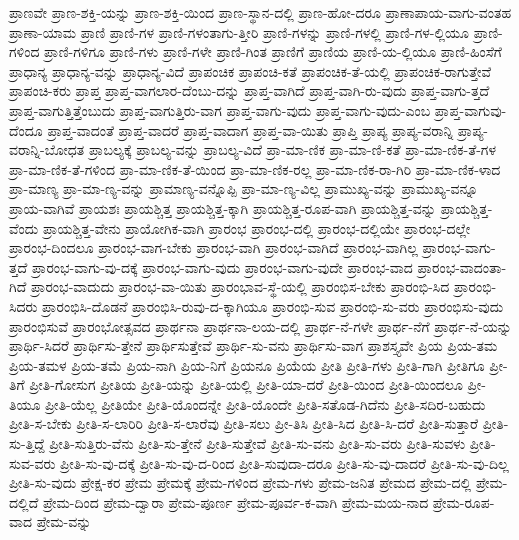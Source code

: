 {ಪ್ರಾಣವೇ
ಪ್ರಾಣ-ಶಕ್ತಿ-ಯನ್ನು
ಪ್ರಾಣ-ಶಕ್ತಿ-ಯಿಂದ
ಪ್ರಾಣ-ಸ್ಥಾನ-ದಲ್ಲಿ
ಪ್ರಾಣ-ಹೋ-ದರೂ
ಪ್ರಾಣಾಪಾಯ-ವಾಗು-ವಂತಹ
ಪ್ರಾಣಾ-ಯಾಮ
ಪ್ರಾಣಿ
ಪ್ರಾಣಿ-ಗಳ
ಪ್ರಾಣಿ-ಗಳಂತಾಗು-ತ್ತೀರಿ
ಪ್ರಾಣಿ-ಗಳನ್ನು
ಪ್ರಾಣಿ-ಗಳಲ್ಲಿ
ಪ್ರಾಣಿ-ಗಳ-ಲ್ಲಿಯೂ
ಪ್ರಾಣಿ-ಗಳಿಂದ
ಪ್ರಾಣಿ-ಗಳಿಗೂ
ಪ್ರಾಣಿ-ಗಳು
ಪ್ರಾಣಿ-ಗಳೇ
ಪ್ರಾಣಿ-ಗಿಂತ
ಪ್ರಾಣಿಗೆ
ಪ್ರಾಣಿಯ
ಪ್ರಾಣಿ-ಯ-ಲ್ಲಿಯೂ
ಪ್ರಾಣಿ-ಹಿಂಸೆಗೆ
ಪ್ರಾಧಾನ್ಯ
ಪ್ರಾಧಾನ್ಯ-ವನ್ನು
ಪ್ರಾಧಾನ್ಯ-ವಿದೆ
ಪ್ರಾಪಂಚಿಕ
ಪ್ರಾಪಂಚಿ-ಕತೆ
ಪ್ರಾಪಂಚಿಕ-ತೆ-ಯಲ್ಲಿ
ಪ್ರಾಪಂಚಿಕ-ರಾಗುತ್ತೇವೆ
ಪ್ರಾಪಂಚಿ-ಕರು
ಪ್ರಾಪ್ತ
ಪ್ರಾಪ್ತ-ವಾಗಲಾರ-ದೆಂಬು-ದನ್ನು
ಪ್ರಾಪ್ತ-ವಾಗಿದೆ
ಪ್ರಾಪ್ತ-ವಾಗಿ-ರು-ವುದು
ಪ್ರಾಪ್ತ-ವಾಗು-ತ್ತದೆ
ಪ್ರಾಪ್ತ-ವಾಗುತ್ತಿತ್ತೆಂಬುದು
ಪ್ರಾಪ್ತ-ವಾಗುತ್ತಿರು-ವಾಗ
ಪ್ರಾಪ್ತ-ವಾಗು-ವುದು
ಪ್ರಾಪ್ತ-ವಾಗು-ವುದು-ಎಂಬ
ಪ್ರಾಪ್ತ-ವಾಗುವು-ದೆಂದೂ
ಪ್ರಾಪ್ತ-ವಾದಂತೆ
ಪ್ರಾಪ್ತ-ವಾದರೆ
ಪ್ರಾಪ್ತ-ವಾದಾಗ
ಪ್ರಾಪ್ತ-ವಾ-ಯಿತು
ಪ್ರಾಪ್ತಿ
ಪ್ರಾಪ್ಯ
ಪ್ರಾಪ್ಯ-ವರಾನ್ನಿ
ಪ್ರಾಪ್ಯ-ವರಾನ್ನಿ-ಬೋಧತ
ಪ್ರಾಬಲ್ಯಕ್ಕೆ
ಪ್ರಾಬಲ್ಯ-ವನ್ನು
ಪ್ರಾಬಲ್ಯ-ವಿದೆ
ಪ್ರಾ-ಮಾ-ಣಿಕ
ಪ್ರಾ-ಮಾ-ಣಿ-ಕತೆ
ಪ್ರಾ-ಮಾ-ಣಿಕ-ತೆ-ಗಳ
ಪ್ರಾ-ಮಾ-ಣಿಕ-ತೆ-ಗಳಿಂದ
ಪ್ರಾ-ಮಾ-ಣಿಕ-ತೆ-ಯಿಂದ
ಪ್ರಾ-ಮಾ-ಣಿಕ-ರಲ್ಲ
ಪ್ರಾ-ಮಾ-ಣಿಕ-ರಾ-ಗಿರಿ
ಪ್ರಾ-ಮಾ-ಣಿಕ-ಳಾದ
ಪ್ರಾ-ಮಾಣ್ಯ
ಪ್ರಾ-ಮಾ-ಣ್ಯ-ವನ್ನು
ಪ್ರಾಮಾಣ್ಯ-ವನ್ನೊಪ್ಪಿ
ಪ್ರಾ-ಮಾ-ಣ್ಯ-ವಿಲ್ಲ
ಪ್ರಾಮುಖ್ಯ-ವನ್ನು
ಪ್ರಾಮುಖ್ಯ-ವನ್ನೂ
ಪ್ರಾಯ-ವಾಗಿವೆ
ಪ್ರಾಯಶಃ
ಪ್ರಾಯಶ್ಚಿತ್ತ
ಪ್ರಾಯಶ್ಚಿತ್ತ-ಕ್ಕಾಗಿ
ಪ್ರಾಯಶ್ಚಿತ್ತ-ರೂಪ-ವಾಗಿ
ಪ್ರಾಯಶ್ಚಿತ್ತ-ವನ್ನು
ಪ್ರಾಯಶ್ಚಿತ್ತ-ವೆಂದು
ಪ್ರಾಯಶ್ಚಿತ್ತ-ವೇನು
ಪ್ರಾಯೋಗಿಕ-ವಾಗಿ
ಪ್ರಾರಂಭ
ಪ್ರಾರಂಭ-ದಲ್ಲಿ
ಪ್ರಾರಂಭ-ದಲ್ಲಿಯೇ
ಪ್ರಾರಂಭ-ದಲ್ಲೇ
ಪ್ರಾರಂಭ-ದಿಂದಲೂ
ಪ್ರಾರಂಭ-ವಾಗ-ಬೇಕು
ಪ್ರಾರಂಭ-ವಾಗಿ
ಪ್ರಾರಂಭ-ವಾಗಿದೆ
ಪ್ರಾರಂಭ-ವಾಗಿಲ್ಲ
ಪ್ರಾರಂಭ-ವಾಗು-ತ್ತದೆ
ಪ್ರಾರಂಭ-ವಾಗು-ವು-ದಕ್ಕೆ
ಪ್ರಾರಂಭ-ವಾಗು-ವುದು
ಪ್ರಾರಂಭ-ವಾಗು-ವುದೇ
ಪ್ರಾರಂಭ-ವಾದ
ಪ್ರಾರಂಭ-ವಾದಂತಾ-ಗಿದೆ
ಪ್ರಾರಂಭ-ವಾದುದು
ಪ್ರಾರಂಭ-ವಾ-ಯಿತು
ಪ್ರಾರಂಭಾವ-ಸ್ಥೆ-ಯಲ್ಲಿ
ಪ್ರಾರಂಭಿಸ-ಬೇಕು
ಪ್ರಾರಂಭಿ-ಸಿದ
ಪ್ರಾರಂಭಿ-ಸಿದರು
ಪ್ರಾರಂಭಿಸಿ-ದೊಡನೆ
ಪ್ರಾರಂಭಿಸಿ-ರುವು-ದ-ಕ್ಕಾಗಿಯೂ
ಪ್ರಾರಂಭಿ-ಸುವ
ಪ್ರಾರಂಭಿ-ಸು-ವರು
ಪ್ರಾರಂಭಿಸು-ವುದು
ಪ್ರಾರಂಭಿಸುವೆ
ಪ್ರಾರಂಭೋತ್ಸವದ
ಪ್ರಾರ್ಥನಾ
ಪ್ರಾರ್ಥನಾ-ಲಯ-ದಲ್ಲಿ
ಪ್ರಾರ್ಥ-ನೆ-ಗಳೇ
ಪ್ರಾರ್ಥ-ನೆಗೆ
ಪ್ರಾರ್ಥ-ನೆ-ಯನ್ನು
ಪ್ರಾರ್ಥಿ-ಸಿದರೆ
ಪ್ರಾರ್ಥಿಸು-ತ್ತೇನೆ
ಪ್ರಾರ್ಥಿಸುತ್ತೇವೆ
ಪ್ರಾರ್ಥಿ-ಸು-ವನು
ಪ್ರಾರ್ಥಿಸು-ವಾಗ
ಪ್ರಾಶಸ್ತ್ಯವೇ
ಪ್ರಿಯ
ಪ್ರಿಯ-ತಮ
ಪ್ರಿಯ-ತಮಳ
ಪ್ರಿಯ-ತಮೆ
ಪ್ರಿಯ-ನಾಗಿ
ಪ್ರಿಯ-ನಿಗೆ
ಪ್ರಿಯನೂ
ಪ್ರಿಯೆಯ
ಪ್ರೀತಿ
ಪ್ರೀತಿ-ಗಳು
ಪ್ರೀತಿ-ಗಾಗಿ
ಪ್ರೀತಿಗೂ
ಪ್ರೀ-ತಿಗೆ
ಪ್ರೀತಿ-ಗೋಸುಗ
ಪ್ರೀತಿಯ
ಪ್ರೀತಿ-ಯನ್ನು
ಪ್ರೀತಿ-ಯಲ್ಲಿ
ಪ್ರೀತಿ-ಯಾ-ದರೆ
ಪ್ರೀತಿ-ಯಿಂದ
ಪ್ರೀತಿ-ಯಿಂದಲೂ
ಪ್ರೀ-ತಿಯೂ
ಪ್ರೀತಿ-ಯೆಲ್ಲ
ಪ್ರೀತಿಯೇ
ಪ್ರೀತಿ-ಯೊಂದನ್ನೇ
ಪ್ರೀತಿ-ಯೊಂದೇ
ಪ್ರೀತಿ-ಸತೊಡ-ಗಿದೆನು
ಪ್ರೀತಿ-ಸದಿರ-ಬಹುದು
ಪ್ರೀತಿ-ಸ-ಬೇಕು
ಪ್ರೀತಿ-ಸ-ಲಾರಿರಿ
ಪ್ರೀತಿ-ಸ-ಲಾರೆವು
ಪ್ರೀತಿ-ಸಲು
ಪ್ರೀ-ತಿಸಿ
ಪ್ರೀತಿ-ಸಿದ
ಪ್ರೀತಿ-ಸಿ-ದರೆ
ಪ್ರೀತಿ-ಸುತ್ತಾರೆ
ಪ್ರೀತಿ-ಸು-ತ್ತಿದ್ದೆ
ಪ್ರೀತಿ-ಸುತ್ತಿರು-ವೆನು
ಪ್ರೀತಿ-ಸು-ತ್ತೇನೆ
ಪ್ರೀತಿ-ಸುತ್ತೇವೆ
ಪ್ರೀತಿ-ಸು-ವನು
ಪ್ರೀತಿ-ಸು-ವರು
ಪ್ರೀತಿ-ಸುವಳು
ಪ್ರೀತಿ-ಸುವ-ವರು
ಪ್ರೀತಿ-ಸು-ವು-ದಕ್ಕೆ
ಪ್ರೀತಿ-ಸು-ವು-ದ-ರಿಂದ
ಪ್ರೀತಿ-ಸುವುದಾ-ದರೂ
ಪ್ರೀತಿ-ಸು-ವು-ದಾದರೆ
ಪ್ರೀತಿ-ಸು-ವು-ದಿಲ್ಲ
ಪ್ರೀತಿ-ಸು-ವುದು
ಪ್ರೇಕ್ಷ-ಕರ
ಪ್ರೇಮ
ಪ್ರೇಮಕ್ಕೆ
ಪ್ರೇಮ-ಗಳಿಂದ
ಪ್ರೇಮ-ಗಳು
ಪ್ರೇಮ-ಜನಿತ
ಪ್ರೇಮದ
ಪ್ರೇಮ-ದಲ್ಲಿ
ಪ್ರೇಮ-ದಲ್ಲಿದೆ
ಪ್ರೇಮ-ದಿಂದ
ಪ್ರೇಮ-ದ್ವಾರಾ
ಪ್ರೇಮ-ಪೂರ್ಣ
ಪ್ರೇಮ-ಪೂರ್ವ-ಕ-ವಾಗಿ
ಪ್ರೇಮ-ಮಯ-ನಾದ
ಪ್ರೇಮ-ರೂಪ-ವಾದ
ಪ್ರೇಮ-ವನ್ನು
}
